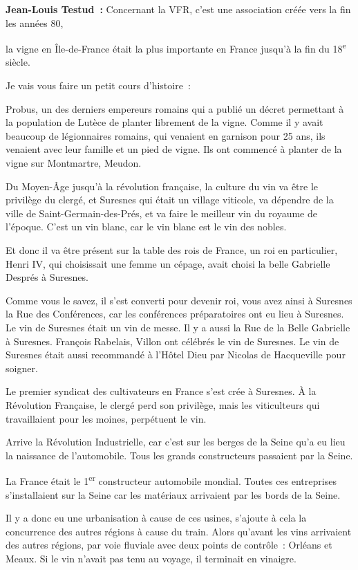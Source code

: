 \documentclass[a4paper, titlepage]{report}
\begin{document}
\textbf{Jean-Louis Testud~:} Concernant la VFR, c'est une association
créée vers la fin les années 80,

la vigne en Île-de-France était la plus importante en France jusqu'à la
fin du 18\textsuperscript{e} siècle.

Je vais vous faire un petit cours d'histoire~:

Probus, un des derniers empereurs romains qui a publié un décret
permettant à la population de Lutèce de planter librement de la vigne.
Comme il y avait beaucoup de légionnaires romains, qui venaient en
garnison pour 25 ans, ils venaient avec leur famille et un pied de
vigne. Ils ont commencé à planter de la vigne sur Montmartre, Meudon.

Du Moyen-Âge jusqu'à la révolution française, la culture du vin va être
le privilège du clergé, et Suresnes qui était un village viticole, va
dépendre de la ville de Saint-Germain-des-Prés, et va faire le meilleur
vin du royaume de l'époque. C'est un vin blanc, car le vin blanc est le
vin des nobles.

Et donc il va être présent sur la table des rois de France, un roi en
particulier, Henri IV, qui choisissait une femme un cépage, avait choisi
la belle Gabrielle Després à Suresnes.

Comme vous le savez, il s'est converti pour devenir roi, vous avez ainsi
à Suresnes la Rue des Conférences, car les conférences préparatoires ont
eu lieu à Suresnes. Le vin de Suresnes était un vin de messe. Il y a
aussi la Rue de la Belle Gabrielle à Suresnes. François Rabelais, Villon ont célébrés le vin de Suresnes. Le vin de
Suresnes était aussi recommandé à l'Hôtel Dieu par Nicolas de
Hacqueville pour soigner.

Le premier syndicat des cultivateurs en France s'est crée à Suresnes. À
la Révolution Française, le clergé perd son privilège, mais les
viticulteurs qui travaillaient pour les moines, perpétuent le vin.

Arrive la Révolution Industrielle, car c'est sur les berges de la Seine
qu'a eu lieu la naissance de l'automobile. Tous les grands constructeurs
passaient par la Seine.

La France était le 1\textsuperscript{er} constructeur automobile
mondial. Toutes ces entreprises s'installaient sur la Seine car les
matériaux arrivaient par les bords de la Seine.

Il y a donc eu une urbanisation à cause de ces usines, s'ajoute à cela
la concurrence des autres régions à cause du train. Alors qu'avant les
vins arrivaient des autres régions, par voie fluviale avec deux points de
contrôle~: Orléans et Meaux. Si le vin n'avait pas tenu au voyage, il
terminait en vinaigre.
\end{document}
